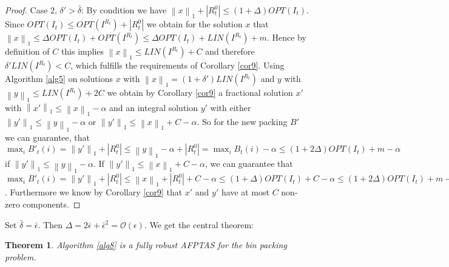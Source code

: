 \documentclass[a4paper,11pt]{article}
\newcommand{\nor}[1]{\left\|#1\right\|}
\newtheorem{thm}{Theorem}
\begin{document}
\begin{proof}
	Case 2, $\delta' > \bar{\delta}$: 
	By condition we have $\nor{x}_1 + |R_{t}^0| \leq (1+ \Delta) \mathit{OPT}(I_t)$. Since
	$ \mathit{OPT}(I_t) \leq  \mathit{OPT}(I^{R_t}) + |R_{t}^0|$ we obtain for the solution $x$ that
	$\nor{x}_1 \leq \Delta \mathit{OPT}(I_t) + \mathit{OPT}(I^{R_t}) \leq  \Delta \mathit{OPT}(I_t) + \mathit{LIN}(I^{R_t}) +m$.
	Hence by definition of $C$ this implies $\nor{x}_1 \leq  \mathit{LIN}(I^{R_t}) + C$ and therefore $\delta' \mathit{LIN}(I^{R_t}) < C$,
	which fulfills the requirements of Corollary \ref{cor9}.
	Using Algorithm \ref{alg5} on solutions $x$ with $\nor{x}_1 = (1+\delta')\mathit{LIN}(I^{R_t})$ and $y$ with 
	$\nor{y}_1 \leq  \mathit{LIN}(I^{R_t}) + 2C$
	we obtain by Corollary \ref{cor9} a fractional solution $x'$ with
	$\nor{x'}_1 \leq \nor{x}_1 - \alpha$ and an integral solution $y'$ with either
	$\nor{y'}_1 \leq \nor{y}_1 - \alpha$ or $\nor{y'}_1 \leq \nor{x}_1 + C - \alpha$.
	So for the new packing $B'$ we can guarantee, that
	$\max_i B'_t (i) = \nor{y'}_1 + |R_{t}^0| \leq \nor{y}_1 - \alpha + |R_{t}^0| =  \max_i B_t (i) - \alpha
	\leq (1+ 2\Delta) \mathit{OPT}(I_t) +m - \alpha$
	if $\nor{y'}_1 \leq \nor{y}_1 - \alpha$. If $\nor{y'}_1 \leq \nor{x}_1 + C - \alpha$, we can guarantee
	that $\max_i B'_t (i) = \nor{y'}_1 + |R_{t}^0| \leq \nor{x}_1 + |R_{t}^0| + C - \alpha \leq 
	(1+ \Delta) \mathit{OPT}(I_t)+ C - \alpha \leq (1+ 2\Delta) \mathit{OPT}(I_t) +m 
	- \alpha$.
	Furthermore we know by Corollary \ref{cor9} that $x'$ and $y'$ have at most $C$ 
	non-zero components.
\end{proof}
Set $\bar{\delta} = \bar{\epsilon}$. Then $\Delta = 2 \bar{\epsilon} + \bar{\epsilon}^2 = \mathcal{O}(\epsilon)$.
We get the central theorem:
\begin{thm}\label{thm16}
  Algorithm \ref{alg8} is a fully robust AFPTAS for the bin packing problem.
\end{thm}
\end{document}
